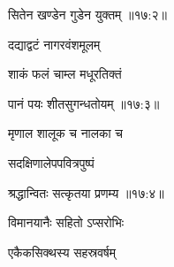 \nemslokad

{\devanagarifontbold सितेन खण्डेन गुडेन युक्तम् {॥१७:२॥} \veg\dontdisplaylinenum }%
 
\ujvers{}    %


\nemslokab

{\devanagarifontbold दद्याद्वटं नागरवंशमूलम्  \danda\dontdisplaylinenum }%

\nemslokac

{\devanagarifontbold शाकं फलं चाम्ल मधूरतिक्तं }%
  \dontdisplaylinenum

\nemslokad

{\devanagarifontbold पानं पयः शीतसुगन्धतोयम् {॥१७:३॥} \veg\dontdisplaylinenum }%
 
\ujvers{}

\nemslokab

{\devanagarifontbold मृणाल शालूक च नालका च  \danda\dontdisplaylinenum }%

\nemslokac

{\devanagarifontbold सदक्षिणालेपपवित्रपुष्पं }%
  \dontdisplaylinenum

\nemslokad

{\devanagarifontbold श्रद्धान्वितः सत्कृतया प्रणम्य {॥१७:४॥} \veg\dontdisplaylinenum }%

\ujvers{}    %


\nemslokab

{\devanagarifontbold विमानयानैः सहितो ऽप्सरोभिः  \danda\dontdisplaylinenum }%
 
\nemslokac

{\devanagarifontbold एकैकसिक्थस्य सहस्रवर्षम् }%
  \dontdisplaylinenum    {}%


